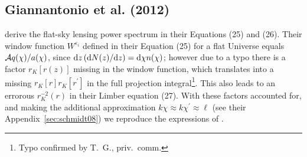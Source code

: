 \documentclass[fleqn,usenatbib]{mnras} %
\newcommand{\pref}{{\cal A}}
\begin{document}
\begin{appendix}
\subsection{Giannantonio et al. (2012)}
\label{sec:giannantonio12}

\cite{2012MNRAS.422.2854G} derive the flat-sky lensing power spectrum in their
Equations (25) and (26). Their window function $W^{\varepsilon_i}$ defined in
their Equation (25) for a flat Universe equals $\pref q(\chi) / a(\chi)$, since
${\rm d} z \, ({\rm d} N(z)/{\rm d} z) = {\rm d} \chi n(\chi)$; however due to
a typo there is a factor $r_K[r(z)]$ missing in the window function, which
translates into a missing $r_K[r] r_K[r^\prime]$ in the full projection
integral\footnote{Typo confirmed by T.~G., priv.~comm.}. This also leads to an
errorous $r_K^{-2}(r)$ in their Limber equation (27). With these factors
accounted for, and making the additional approximation $k \chi \approx k
\chi^\prime \approx \ell$ (see their Appendix~\ref{sec:schmidt08}) we reproduce
the expressions of \cite{2012MNRAS.422.2854G}.


\label{lastpage}

\end{appendix}
\end{document}
